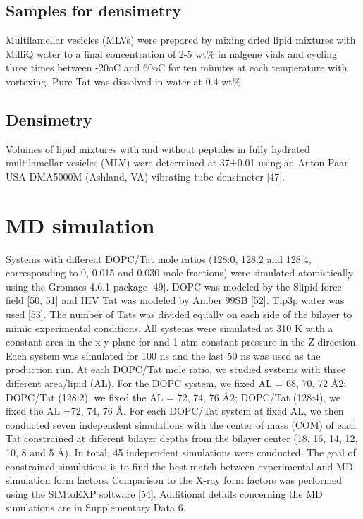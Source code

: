 \subsection{Samples for densimetry}
Multilamellar vesicles (MLVs) were prepared by mixing dried lipid mixtures with 
MilliQ
water to a final concentration of 2-5 wt\% in nalgene vials and cycling three 
times between -20oC
and 60oC for ten minutes at each temperature with vortexing. Pure Tat was 
dissolved in water
at 0.4 wt\%.

\subsection{Densimetry}
Volumes of lipid mixtures with and without peptides in fully hydrated multilamellar
vesicles (MLV) were determined at 37±0.01 \degC using an Anton-Paar USA DMA5000M
(Ashland, VA) vibrating tube densimeter [47].


\section{MD simulation}
Systems with different DOPC/Tat mole ratios (128:0, 128:2 and 128:4, corresponding to
0, 0.015 and 0.030 mole fractions) were simulated atomistically using the Gromacs 4.6.1
package [49]. DOPC was modeled by the Slipid force field [50, 51] and HIV Tat was modeled
by Amber 99SB [52]. Tip3p water was used [53]. The number of Tats was divided equally on
each side of the bilayer to mimic experimental conditions. All systems were simulated at 310 K
with a constant area in the x-y plane for and 1 atm constant pressure in the Z direction. Each
system was simulated for 100 ns and the last 50 ns was used as the production run.
At each DOPC/Tat mole ratio, we studied systems with three different area/lipid (AL).
For the DOPC system, we fixed AL = 68, 70, 72 Å2; DOPC/Tat (128:2), we fixed the AL = 72,
74, 76 Å2; DOPC/Tat (128:4), we fixed the AL =72, 74, 76 Å. For each DOPC/Tat system at
fixed AL, we then conducted seven independent simulations with the center of mass (COM) of
each Tat constrained at different bilayer depths from the bilayer center (18, 16, 14, 12, 10, 8 and
5 Å). In total, 45 independent simulations were conducted. The goal of constrained simulations
is to find the best match between experimental and MD simulation form factors. Comparison to
the X-ray form factors was performed using the SIMtoEXP software [54]. Additional details
concerning the MD simulations are in Supplementary Data 6.


